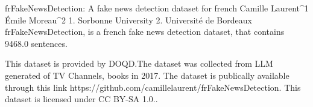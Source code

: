 
frFakeNewsDetection: A fake news detection dataset for french
Camille Laurent^1 Émile Moreau^2
1. Sorbonne University 2. Université de Bordeaux
frFakeNewsDetection, is a french fake news detection dataset, that contains 9468.0 sentences.

This dataset is provided by DOQD.The dataset was collected from LLM generated of TV Channels, books in 2017. 
The dataset is publically available through this link https://github.com/camillelaurent/frFakeNewsDetection. This dataset is licensed under CC BY-SA 1.0..

